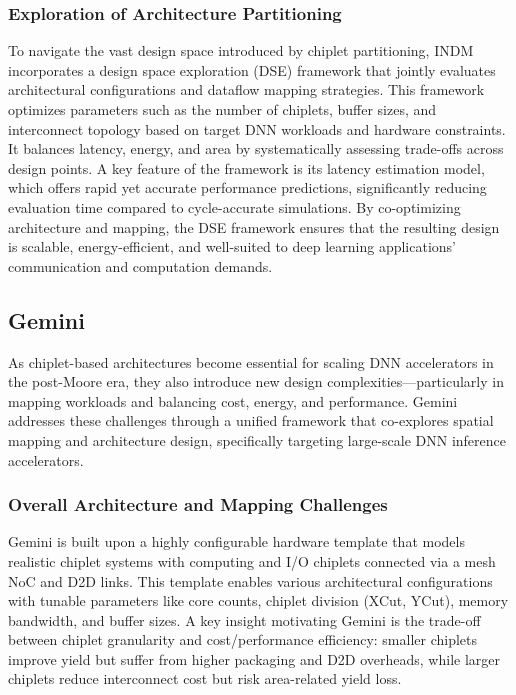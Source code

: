 \documentclass[acmsmall]{acmart}
\begin{document}
\subsubsection{Exploration of Architecture Partitioning}
To navigate the vast design space introduced by chiplet partitioning, INDM incorporates a design space exploration (DSE) framework that jointly evaluates architectural configurations and dataflow mapping strategies. This framework optimizes parameters such as the number of chiplets, buffer sizes, and interconnect topology based on target DNN workloads and hardware constraints. It balances latency, energy, and area by systematically assessing trade-offs across design points. A key feature of the framework is its latency estimation model, which offers rapid yet accurate performance predictions, significantly reducing evaluation time compared to cycle-accurate simulations. By co-optimizing architecture and mapping, the DSE framework ensures that the resulting design is scalable, energy-efficient, and well-suited to deep learning applications' communication and computation demands.

\subsection{Gemini}
As chiplet-based architectures become essential for scaling DNN accelerators in the post-Moore era, they also introduce new design complexities—particularly in mapping workloads and balancing cost, energy, and performance. Gemini addresses these challenges through a unified framework that co-explores spatial mapping and architecture design, specifically targeting large-scale DNN inference accelerators.

\subsubsection{Overall Architecture and Mapping Challenges}
Gemini is built upon a highly configurable hardware template that models realistic chiplet systems with computing and I/O chiplets connected via a mesh NoC and D2D links. This template enables various architectural configurations with tunable parameters like core counts, chiplet division (XCut, YCut), memory bandwidth, and buffer sizes. A key insight motivating Gemini is the trade-off between chiplet granularity and cost/performance efficiency: smaller chiplets improve yield but suffer from higher packaging and D2D overheads, while larger chiplets reduce interconnect cost but risk area-related yield loss.
\end{document}
